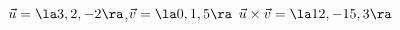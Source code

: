 {$\vec u = \la 3,2,-2\ra$,\quad $\vec v = \la 0,1,5\ra$
}
{$\vec u\times\vec v = \la 12,-15,3\ra$
}
